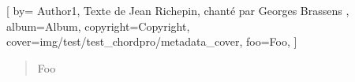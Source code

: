 
[
  by={
         Author1,
        Texte de Jean Richepin, chanté par Georges Brassens  },
  album={Album},
  copyright={Copyright},
    cover={img/test/test_chordpro/metadata_cover},
  foo={Foo},
]

\cover




\begin{verse}
    Foo
\end{verse}

\endsong
